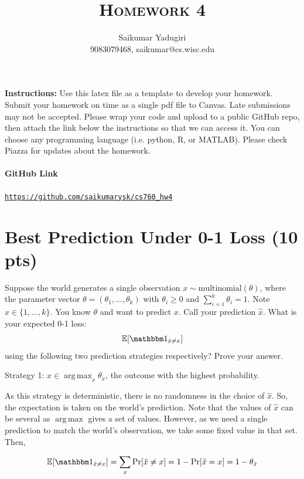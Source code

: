 \documentclass[a4paper]{article}
\title{\textsc{Homework 4}} %
\author{
Saikumar Yadugiri\\
9083079468, saikumar@cs.wisc.edu\\
}
\date{}
\theoremstyle{definition}
\DeclareMathOperator*{\argmax}{arg\,max}
\def\E{\mathbb E}
\def\ind{\mathbbm 1}
\newenvironment{soln}{
    \leavevmode\color{blue}\ignorespaces
}{}
\begin{document}
\maketitle 


\textbf{Instructions:} Use this latex file as a template to develop your homework. Submit your homework on time as a single pdf file to Canvas. Late submissions may not be accepted. Please wrap your code and upload to a public GitHub repo, then attach the link below the instructions so that we can access it. You can choose any programming language (i.e. python, R, or MATLAB). Please check Piazza for updates about the homework.

\paragraph{GitHub Link} \href{https://github.com/saikumarysk/cs760_hw4}{\texttt{https://github.com/saikumarysk/cs760\_hw4}}

\section{Best Prediction Under 0-1 Loss (10 pts)}
Suppose the world generates a single observation $x \sim \mbox{multinomial}(\theta)$, where the parameter vector $\theta=(\theta_1, \ldots, \theta_k)$ with $\theta_i\ge 0$ and $\sum_{i=1}^k \theta_i=1$.  Note $x \in \{1, \ldots, k\}$.
You know $\theta$ and want to predict $x$. 
Call your prediction $\hat x$.  What is your expected 0-1 loss: 
$$\E[\ind_{\hat x \neq x}]$$
using the following two prediction strategies respectively?  Prove your answer.


Strategy 1: $\hat x \in \argmax_x \theta_x$, the outcome with the highest probability.

\begin{soln}
    As this strategy is deterministic, there is no randomness in the choice of $\hat{x}$. So, the expectation is taken on the world's prediction. Note that the values of $\hat{x}$ can be several as $\argmax$ gives a set of values. However, as we need a single prediction to match the world's observation, we take some fixed value in that set. Then,

    \begin{equation*}
        \E [\ind_{\hat{x} \neq x}] = \sum\limits_{x} \Pr [\hat{x} \neq x] = 1 -  \Pr [\hat{x} = x] = 1 - \theta_{\hat{x}}
    \end{equation*}
\end{soln}
\end{document}
